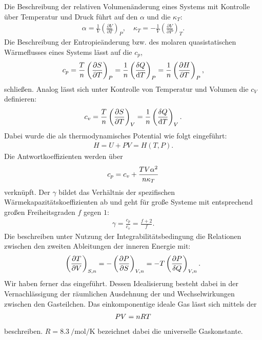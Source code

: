 \begin{summary}
    Die Beschreibung der relativen Volumenänderung eines Systems mit Kontrolle über Temperatur und Druck führt auf den  $\alpha$ und die  $\kappa_T$:
    \begin{align*}
        \alpha=\frac{1}{V}\left( \frac{\partial V}{\partial T}\right)_P, \quad \kappa_T=-\frac{1}{V}\left( \frac{\partial V}{\partial P}\right)_T.
    \end{align*} 
    Die Beschreibung der Entropieänderung bzw. des molaren quasistatischen Wärmeflusses eines Systems lässt auf die  $c_p$,
    \begin{align*}
    c_p=\frac{T}{n} \left( \frac{\partial S}{\partial T} \right)_P= \frac{1}{n} \left( \frac{\mathop{}\!\delta Q}{\mathop{}\!\mathrm{d} T} \right)_P =\frac{1}{n}\left( \frac{\partial H}{\partial T}\right)_P,
    \end{align*}
    schließen. Analog lässt sich unter Kontrolle von Temperatur und Volumen die  $c_V$ definieren:
    \begin{align*}
    c_v=\frac{T}{n}\left(\frac{\partial S}{\partial T}\right)_V=\frac{1}{n}\left(\frac{\mathop{}\!\delta Q}{\mathop{}\!\mathrm{d} T}\right)_V.
    \end{align*}
    Dabei wurde die  als thermodynamisches Potential wie folgt eingeführt:
    \begin{align*}
        H=U+PV=H(T,P).
    \end{align*}
    Die Antwortkoeffizienten werden über
    \begin{align*}
    c_p=c_v+\frac{TV\alpha^2}{n \kappa_T}
    \end{align*}
    verknüpft.
    Der  $\gamma$ bildet das Verhältnis der spezifischen Wärmekapazitätskoeffizienten ab und geht für große Systeme mit entsprechend großen Freiheitsgraden $f$ gegen $1$:
    \begin{align*}
        \gamma=\frac{c_p}{c_v}=\frac{f+2}{f}.
    \end{align*}
    Die  beschreiben unter Nutzung der Integrabilitätsbedingung die Relationen zwischen den zweiten Ableitungen der inneren Energie mit:
    \begin{align*}
    \left(\frac{\partial T}{\partial V}\right)_{S,n }=-\left(\frac{\partial P}{\partial S}\right)_{V,n }=-T\left(\frac{\partial P}{\mathop{}\!\delta Q}\right)_{V,n }.
    \end{align*}
    Wir haben ferner das  eingeführt. Dessen Idealisierung besteht dabei in der Vernachlässigung der räumlichen Ausdehnung der \textendash{} und Wechselwirkungen zwischen den \textendash{} Gasteilchen.
    Das einkomponentige ideale Gas lässt sich mittels der  
    \begin{align*}
        PV=n RT
    \end{align*}
    beschreiben. $R=\qty{8,3}{\per\mole\per\kelvin}$ bezeichnet dabei die universelle Gaskonstante.


\end{summary}
